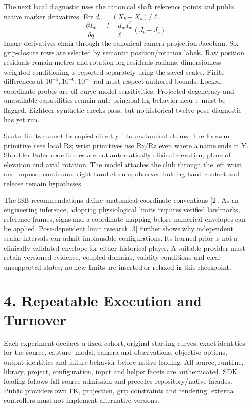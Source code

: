 \documentclass[11pt,a4paper]{article}
\begin{document}
The next local diagnostic uses the canonical shaft reference points and public native marker derivatives. For $d_w=(X_b-X_a)/\ell$,
\[
 \frac{\partial d_w}{\partial q}=
 \frac{I-d_wd_w^T}{\ell}\left(J_b-J_a\right).
\]
Image derivatives chain through the canonical camera projection Jacobian. Six grip-closure rows are selected by semantic position/rotation labels. Raw position residuals remain metres and rotation-log residuals radians; dimensionless weighted conditioning is reported separately using the saved scales. Finite differences at $10^{-5},10^{-6},10^{-7}$ rad must respect authored bounds. Locked-coordinate probes are off-curve model sensitivities. Projected degeneracy and unavailable capabilities remain null; principal-log behavior near $\pi$ must be flagged. Eighteen synthetic checks pass, but no historical twelve-pose diagnostic has yet run.

Scalar limits cannot be copied directly into anatomical claims. The forearm primitive uses local Rz; wrist primitives use Rx/Rz even where a name ends in Y. Shoulder Euler coordinates are not automatically clinical elevation, plane of elevation and axial rotation. The model attaches the club through the left wrist and imposes continuous right-hand closure; observed holding-hand contact and release remain hypotheses.

The ISB recommendations define anatomical coordinate conventions [2]. As an engineering inference, adopting physiological limits requires verified landmarks, reference frames, signs and a coordinate mapping before numerical envelopes can be applied. Pose-dependent limit research [3] further shows why independent scalar intervals can admit implausible configurations. Its learned prior is not a clinically validated envelope for either historical player. A suitable provider must retain versioned evidence, coupled domains, validity conditions and clear unsupported states; no new limits are inserted or relaxed in this checkpoint.

\newpage
\section*{4. Repeatable Execution and Turnover}
Each experiment declares a fixed cohort, original starting curves, exact identities for the source, capture, model, camera and observations, objective options, output identities and failure behavior before native loading. All source, runtime, library, project, configuration, input and helper facets are authenticated. SDK loading follows full source admission and precedes repository/native facades. Public providers own FK, projection, grip constraints and rendering; external controllers must not implement alternative versions.
\end{document}
